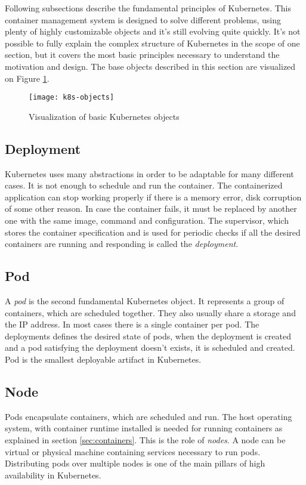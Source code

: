 \documentclass[
  digital, %
  twoside, %
  table,   %
  lof,     %
  lot,     %
]{fithesis3}
\begin{document}
Following subsections describe the fundamental principles of Kubernetes. This container management system is designed to solve different problems, using plenty of highly customizable objects and it's still evolving quite quickly. It's not possible to fully explain the complex structure of Kubernetes in the scope of one section, but it covers the most basic principles necessary to understand the motivation and design. The base objects described in this section are visualized on Figure \ref{fig:k8s_objects}.

\begin{figure}[H]
\caption{Visualization of basic Kubernetes objects}
\centering
\texttt{[image: k8s-objects]}
\label{fig:k8s_objects}
\end{figure}

\subsection{Deployment} \label{sec:deployment}
Kubernetes uses many abstractions in order to be adaptable for many different cases. It is not enough to schedule and run the container. The containerized application can stop working properly if there is a memory error, disk corruption of some other reason. In case the container fails, it must be replaced by another one with the same image, command and configuration. The supervisor, which stores the container specification and is used for periodic checks if all the desired containers are running and responding is called the \textit{deployment}.

\subsection{Pod} \label{sec:pod}
A \textit{pod} is the second fundamental Kubernetes object. It represents a group of containers, which are scheduled together. They also usually share a storage and the IP address. In most cases there is a single container per pod. The deployments defines the desired state of pods, when the deployment is created and a pod satisfying the deployment doesn't exists, it is scheduled and created. Pod is the smallest deployable artifact in Kubernetes.

\subsection{Node} \label{sec:node}
Pods encapsulate containers, which are scheduled and run. The host operating system, with container runtime installed is needed for running containers as explained in section \ref{sec:containers}. This is the role of \textit{nodes}. A node can be virtual or physical machine containing services necessary to run pods. Distributing pods over multiple nodes is one of the main pillars of high availability in Kubernetes.
\end{document}
